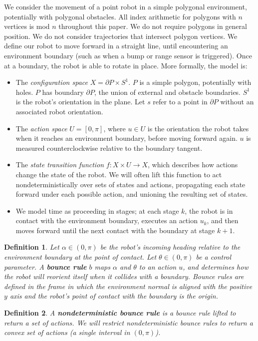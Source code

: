\documentclass[]{article}
\newtheorem{definition}{Definition}
\begin{document}
We consider the movement of a point robot in a simple polygonal environment,
potentially with polygonal obstacles. All index arithmetic for polygons with $n$ vertices is mod $n$ 
throughout this paper. We do not require polygons in general position. We do
not consider trajectories that intersect polygon vertices. We define our robot to move forward in a straight line, until
encountering an environment boundary (such as when a bump or range sensor is
triggered). Once at a boundary, the robot is able to rotate in place. More formally, the model is:
\begin{itemize}
\item The \emph{configuration space} $X = \partial P \times S^1$. $P$ is a simple polygon,
potentially with holes. $P$ has boundary $\partial P$, the union of external
and obstacle boundaries. $S^1$ is the robot's orientation in the plane. Let $s$ refer to a point in $\partial P$ without an associated robot orientation.
\item The \emph{action space} $U = [0,\pi]$, where $u \in U$ is the
orientation the robot takes when it reaches an environment boundary, before
moving forward again. $u$ is measured counterclockwise
relative to the boundary tangent. 
\item The \emph{state transition function} $f: X \times U \to X$, which
describes how actions change the state of the robot. We will often lift this function to act nondeterministically over sets
of states and actions, propagating each state forward under each possible action,
and unioning the resulting set of states. 
\item We model time as proceeding in stages; at each stage $k$, the robot
is in contact with the environment boundary, executes an action $u_k$, and then
moves forward until the next contact with the boundary at stage $k+1$.
\end{itemize}


\begin{definition}
Let $\alpha \in (0,\pi)$ be the robot's incoming heading relative to the
environment boundary at the point of contact. Let $\theta \in (0,\pi)$ be a control parameter. A 
\textbf{bounce rule} $b$ maps $\alpha$ and $\theta$ to an action
$u$, and determines how the robot will reorient itself when it collides with a
boundary. Bounce rules are defined in the
frame in which the environment normal is aligned with the positive $y$ axis and the
robot's point of contact with the boundary is the origin.
\end{definition}
\begin{definition}
A \textbf{nondeterministic bounce rule} is a bounce rule lifted to return a set of actions. 
We will restrict nondeterministic bounce rules to
return a convex set of actions (a single interval in $(0, \pi)$).
\end{definition}
\end{document}
